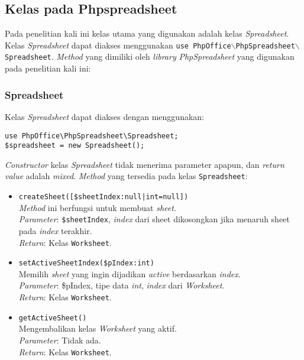 \subsection{Kelas pada Phpspreadsheet}
Pada penelitian kali ini kelas utama yang digunakan adalah kelas \textit{Spreadsheet}. Kelas \textit{Spreadsheet} dapat diakses menggunakan \texttt{use PhpOffice$\backslash$PhpSpreadsheet$\backslash$Spreadsheet}.
 \textit{Method} yang dimiliki oleh \textit{library} \textit{PhpSpreadsheet} yang digunakan pada penelitian kali ini:


\subsubsection{Spreadsheet}
	Kelas \textit{Spreadsheet} dapat diakses dengan menggunakan: 
	\begin{lstlisting}
use PhpOffice\PhpSpreadsheet\Spreadsheet;
$spreadsheet = new Spreadsheet();
	\end{lstlisting} 
	\textit{Constructor} kelas \textit{Spreadsheet} tidak menerima parameter apapun, dan \textit{return value} adalah \textit{mixed}. \textit{Method} yang tersedia pada kelas \texttt{Spreadsheet}:  
 \begin{itemize}
 	\item \texttt{createSheet([\$sheetIndex:null|int=null])} \\ 
 	\textit{Method} ini berfungsi untuk membuat \textit{sheet}.\\
 	\textit{Parameter}: \texttt{\$sheetIndex}, \textit{index} dari sheet dikosongkan jika menaruh sheet pada \textit{index} terakhir. \\ 
 	\textit{Return}: Kelas \texttt{Worksheet}.
 	
 	\item \texttt{setActiveSheetIndex(\$pIndex:int)}\\ Memilih \textit{sheet} yang ingin dijadikan \textit{active} berdasarkan \textit{index}. \\
 	\textit{Parameter}: \$pIndex, tipe data \textit{int}, \textit{index} dari \textit{Worksheet}. \\
 	\textit{Return}: Kelas \texttt{Worksheet}.
 	
 	\item \texttt{getActiveSheet()}\\
 	 Mengembalikan kelas \textit{Worksheet} yang aktif.\\
 	\textit{Parameter}: Tidak ada. \\ 
 	\textit{Return}: Kelas \texttt{Worksheet}.
 \end{itemize}

